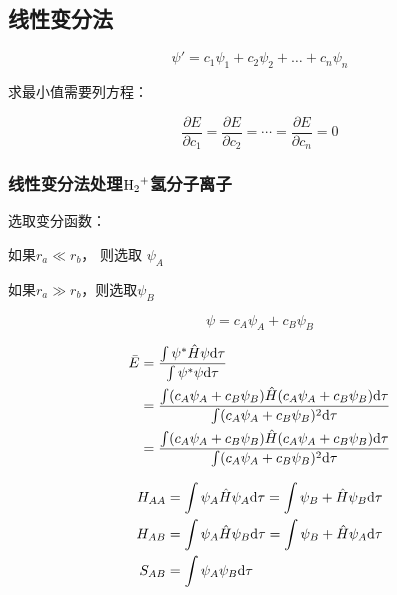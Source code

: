 \subsection{线性变分法}

\begin{equation*}
    \psi ' = c_1 \psi_1 + c_2 \psi_2 + \dots + c_n \psi_n
\end{equation*}


求最小值需要列方程：


\begin{equation*}
    \frac{\partial E}{\partial c_1} = \frac{\partial E}{\partial c_2} = \cdots = \frac{\partial E}{\partial c_n} = 0
\end{equation*}



\subsubsection{线性变分法处理$\ce{H2+}$氢分子离子}

选取变分函数：


如果$r_a \ll r_b$， 则选取 $\psi_A$

如果$r_a \gg r_b$，则选取$\psi_B$

\begin{equation*}
    \psi = c_A \psi_A + c_B \psi_B
\end{equation*}

\begin{align*}
    \bar{E} & = \frac{\int \psi^* \hat{H} \psi \mathrm{d} \tau}{\int \psi^*  \psi \mathrm{d} \tau}                                                   \\
            & = \frac{\int (c_A\psi_A + c_B\psi_B) \hat{H} ( c_A\psi_A + c_B\psi_B) \mathrm{d} \tau}{\int (c_A\psi_A + c_B\psi_B)^2 \mathrm{d} \tau} \\
            & = \frac{\int (c_A\psi_A + c_B\psi_B) \hat{H} ( c_A\psi_A + c_B\psi_B) \mathrm{d} \tau}{\int (c_A\psi_A + c_B\psi_B)^2 \mathrm{d} \tau} \\
\end{align*}


\begin{align*}
    H_{AA} & = \int \psi_A \hat{H} \psi_A \mathrm{d} \tau = \int \psi_B + \hat{H} \psi_B \mathrm{d} \tau \\
    H_{AB} & = \int \psi_A \hat{H} \psi_B \mathrm{d} \tau = \int \psi_B + \hat{H} \psi_A \mathrm{d} \tau \\
    S_{AB} & = \int \psi_A \psi_B \mathrm{d} \tau
\end{align*}



